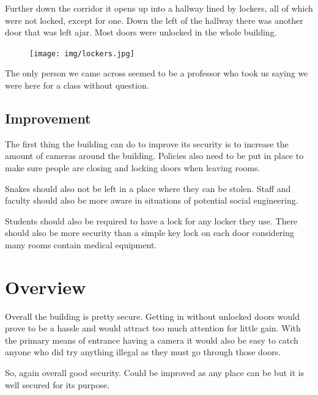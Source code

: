 \documentclass[12pt]{article}
\begin{document}
        Further down the corridor it opens up into a hallway lined by lockers, all of
        which were not locked, except for one. Down the left of the hallway there was
        another door that was left ajar. Most doors were unlocked in the whole building.
        \begin{figure}
        \centering
        \texttt{[image: img/lockers.jpg]}
        \end{figure}

        The only person we came across seemed to be a professor who took us saying we
        were here for a class without question. 

        \subsection{Improvement}
        The first thing the building can do to improve its security is to increase the
        amount of cameras around the building. Policies also need to be put in place
        to make sure people are closing and locking doors when leaving rooms. 

        Snakes should also not be left in a place where they can be stolen. Staff and
        faculty should also be more aware in situations of potential social
        engineering. 

        Students should also be required to have a lock for any locker they use. There
        should also be more security than a simple key lock on each door considering
        many rooms contain medical equipment.

\section{Overview}
        Overall the building is pretty secure. Getting in without unlocked doors would
        prove to be a hassle and would attract too much attention for little gain. 
        With the primary means of entrance having a camera it would also be easy to 
        catch anyone who did try anything illegal as they must go through those doors.

        So, again overall good security. Could be improved as any place can be but it 
        is well secured for its purpose.
\end{document}
